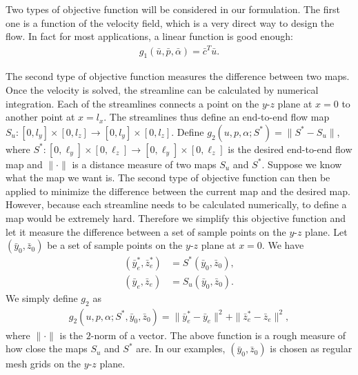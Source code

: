 Two types of objective function will be considered in our
formulation. The first one is a function of the velocity field, which
is a very direct way to design the flow. In fact for most
applications, a linear function is good enough:
\begin{eqnarray}
  g_1(\bar{u},\bar{p},\bar{\alpha}) =
  \bar{c}^T\bar{u}.
\end{eqnarray}




The second type of objective function
  measures the difference between two maps. Once the velocity is
  solved, the streamline can be calculated by numerical
  integration. Each of the streamlines connects a point on the $y$-$z$
  plane at $x=0$ to another point at $x=l_x$. The streamlines thus
  define an end-to-end flow map $S_u:[0,l_y]\times[0,l_z] \to
  [0,l_y]\times[0,l_z]$. Define $g_2(u,p,\alpha;S^*) = \|S^* - S_u\|$,
  where $S^*: [0,\ell_y] \times [0,\ell_z] \to [0,\ell_y] \times
  [0,\ell_z]$ is the desired end-to-end flow map and $\| \cdot \|$ is
  a distance measure of two maps $S_u$ and $S^*$. Suppose we know what
  the map we want is. The second type of objective function can then be
  applied to minimize the difference between the current map and the
  desired map. However, because each streamline needs to be calculated
  numerically, to define a map would be extremely hard. Therefore we
  simplify this objective function and let it measure the difference
  between a set of sample points on the $y$-$z$ plane. Let $(\bar{y}_0,\bar{z}_0)$
  be a set of sample points on the $y$-$z$ plane at $x=0$. We have
\begin{align*}
           (\bar{y}_e^*,\bar{z}_e^*)&= S^*(\bar{y}_0,\bar{z}_0), \\
           (\bar{y}_e,\bar{z}_e)    &= S_u(\bar{y}_0,\bar{z}_0). 
\end{align*}
We simply define $g_2$ as
\begin{eqnarray}
\label{g2}
           g_2(u,p,\alpha;S^*,\bar{y}_0,\bar{z}_0) = \|\bar{y}_e^*-\bar{y}_e\|^2 +  \|\bar{z}_e^*-\bar{z}_e\|^2,
\end{eqnarray}
where $\|\cdot\|$ is the $2$-norm of a vector. The above function is
a rough measure of how close the maps $S_u$ and $S^*$ are. In our
examples, $(\bar{y}_0,\bar{z}_0)$ is chosen as regular mesh grids on the $y$-$z$
plane.
